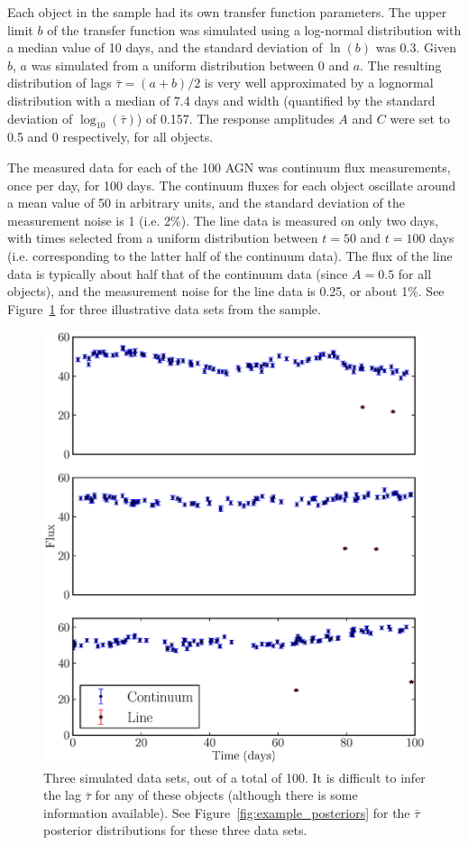 \documentclass[useAMS,usenatbib]{mn2e}
\begin{document}
Each object in the sample had its own transfer function parameters. The upper
limit $b$ of the transfer function was simulated using a log-normal distribution
with a median value of 10 days, and the standard deviation of $\ln(b)$ was
0.3. Given $b$, $a$ was simulated from a uniform distribution between $0$ and
$a$. The resulting distribution of lags $\bar{\tau} = (a+b)/2$ is very well
approximated by a lognormal distribution with a median of 7.4 days and width
(quantified by the standard deviation of $\log_{10}(\bar{\tau})$) of 0.157.
The response amplitudes $A$ and $C$ were set to 0.5 and 0 respectively, for
all objects.

The measured data for each of the 100 AGN was
continuum flux measurements, once per day, for 100 days. The continuum fluxes
for each object oscillate around a mean value of 50 in arbitrary units, and the
standard deviation of the measurement noise is 1 (i.e. 2\%). The line data is measured on
only two days, with times selected from a uniform distribution between $t=50$
and $t=100$ days (i.e. corresponding to the latter half of the continuum data).
The flux of the line data is typically about half that of the continuum data
(since $A=0.5$ for all objects), and the
measurement noise for the line data is 0.25, or about 1\%.
See Figure~\ref{fig:data} for three illustrative data sets from the sample.

\begin{figure}
\begin{center}
\includegraphics[scale=0.5]{Figures/data.eps}
\caption{Three simulated data sets, out of a total of 100. It is difficult to
infer the lag $\bar{\tau}$ for any of these objects (although there is some
information available). See Figure~\ref{fig:example_posteriors} for the
$\bar{\tau}$ posterior distributions for these three data sets.
\label{fig:data}}
\end{center}
\end{figure}
\end{document}
